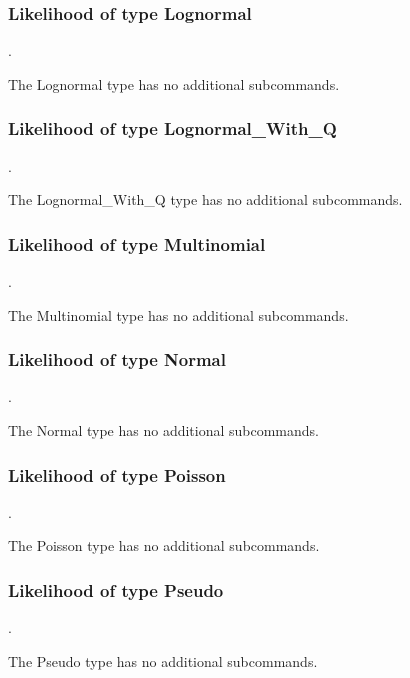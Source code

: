 \subsubsection{Likelihood of type Lognormal}
.
\label{syntax:Likelihood-Lognormal}

The Lognormal type has no additional subcommands.
\subsubsection{Likelihood of type Lognormal\_With\_Q}
.
\label{syntax:Likelihood-LognormalWithQ}

The Lognormal\_With\_Q type has no additional subcommands.
\subsubsection{Likelihood of type Multinomial}
.
\label{syntax:Likelihood-Multinomial}

The Multinomial type has no additional subcommands.
\subsubsection{Likelihood of type Normal}
.
\label{syntax:Likelihood-Normal}

The Normal type has no additional subcommands.
\subsubsection{Likelihood of type Poisson}
.
\label{syntax:Likelihood-Poisson}

The Poisson type has no additional subcommands.
\subsubsection{Likelihood of type Pseudo}
.
\label{syntax:Likelihood-Pseudo}

The Pseudo type has no additional subcommands.
